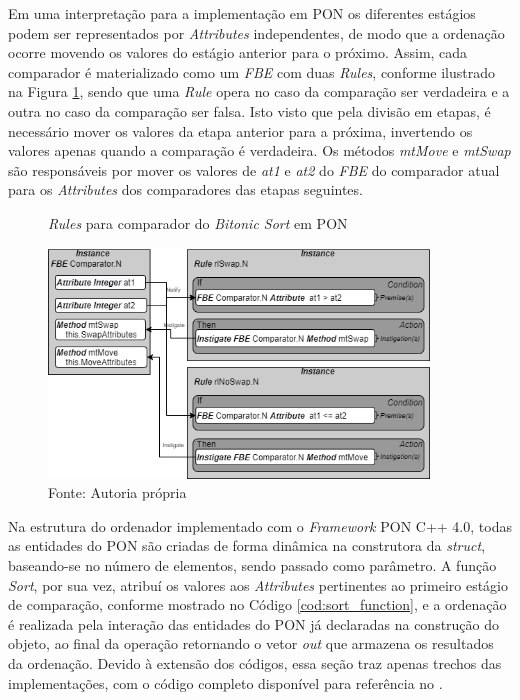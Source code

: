 Em uma interpretação para a implementação em PON os diferentes estágios podem
ser representados por \textit{Attributes} independentes, de modo que a ordenação
ocorre movendo os valores do estágio anterior para o próximo. Assim, cada
comparador é materializado como um \textit{FBE} com duas \textit{Rules},
conforme ilustrado na Figura \ref{fig:rule_bitonic}, sendo que uma \textit{Rule}
opera no caso da comparação ser verdadeira e a outra no caso da comparação ser
falsa. Isto visto que pela divisão em etapas, é necessário mover os valores da
etapa anterior para a próxima, invertendo os valores apenas quando a comparação
é verdadeira. Os métodos \textit{mtMove} e \textit{mtSwap} são responsáveis por
mover os valores de \textit{at1} e \textit{at2} do \textit{FBE} do comparador
atual para os \textit{Attributes} dos comparadores das etapas seguintes.

\begin{figure}[!htb]
\centering
\caption{\textit{Rules} para comparador do \textit{Bitonic Sort} em PON}
\includegraphics[width=0.9\textwidth]{../figures/rule_bitonic.png}
\smallskip
\caption*{Fonte: Autoria própria}
\label{fig:rule_bitonic}
\end{figure}

\FloatBarrier

Na estrutura do ordenador implementado com o \textit{Framework} PON C++ 4.0,
todas as entidades do PON são criadas de forma dinâmica na construtora da
\textit{struct}, baseando-se no número de elementos, sendo passado como
parâmetro. A função \textit{Sort}, por sua vez, atribuí os valores aos
\textit{Attributes} pertinentes ao primeiro estágio de comparação, conforme
mostrado no Código \ref{cod:sort_function}, e a ordenação é realizada pela
interação das entidades do PON já declaradas na construção do objeto, ao final
da operação retornando o vetor \textit{out} que armazena os resultados da
ordenação. Devido à extensão dos códigos, essa seção traz apenas trechos das implementações,
com o código completo disponível para referência no .

